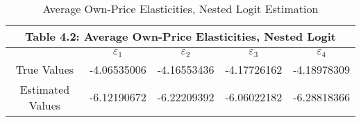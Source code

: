 
\begin{table}
\centering
\begin{tabular}{ |c|c|c|c|c| }
 \hline
 \multicolumn{5}{|c|}{Table 4.2: Average Own-Price Elasticities, Nested Logit} \\
\hline
 & $\varepsilon_1$ &   $\varepsilon_2$ &  $\varepsilon_3$ &  $\varepsilon_4$ \\
 \hline
 True Values & -4.06535006 & -4.16553436 & -4.17726162 & -4.18978309  \\
 \hline
Estimated Values & -6.12190672 & -6.22209392 & -6.06022182 & -6.28818366 \\
 \hline
\end{tabular}
\label{table4_2}
\caption{Average Own-Price Elasticities, Nested Logit Estimation}
\end{table}
